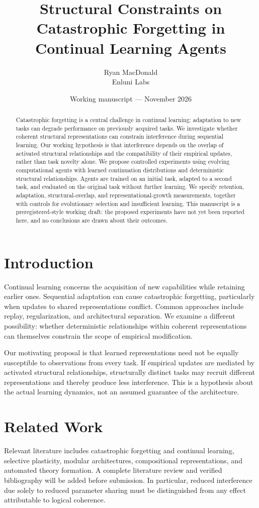 \documentclass[11pt]{article}
\title{Structural Constraints on Catastrophic Forgetting in Continual Learning Agents}
\author{Ryan MacDonald\\Enluni Labs}
\date{Working manuscript --- November 2026}
\begin{document}
\maketitle
\begin{abstract}
Catastrophic forgetting is a central challenge in continual learning: adaptation to new tasks can degrade performance on previously acquired tasks. We investigate whether coherent structural representations can constrain interference during sequential learning. Our working hypothesis is that interference depends on the overlap of activated structural relationships and the compatibility of their empirical updates, rather than task novelty alone. We propose controlled experiments using evolving computational agents with learned continuation distributions and deterministic structural relationships. Agents are trained on an initial task, adapted to a second task, and evaluated on the original task without further learning. We specify retention, adaptation, structural-overlap, and representational-growth measurements, together with controls for evolutionary selection and insufficient learning. This manuscript is a preregistered-style working draft: the proposed experiments have not yet been reported here, and no conclusions are drawn about their outcomes.
\end{abstract}

\section{Introduction}
Continual learning concerns the acquisition of new capabilities while retaining earlier ones. Sequential adaptation can cause catastrophic forgetting, particularly when updates to shared representations conflict. Common approaches include replay, regularization, and architectural separation. We examine a different possibility: whether deterministic relationships within coherent representations can themselves constrain the scope of empirical modification.

Our motivating proposal is that learned representations need not be equally susceptible to observations from every task. If empirical updates are mediated by activated structural relationships, structurally distinct tasks may recruit different representations and thereby produce less interference. This is a hypothesis about the actual learning dynamics, not an assumed guarantee of the architecture.

\section{Related Work}
Relevant literature includes catastrophic forgetting and continual learning, selective plasticity, modular architectures, compositional representations, and automated theory formation. A complete literature review and verified bibliography will be added before submission. In particular, reduced interference due solely to reduced parameter sharing must be distinguished from any effect attributable to logical coherence.
\end{document}
